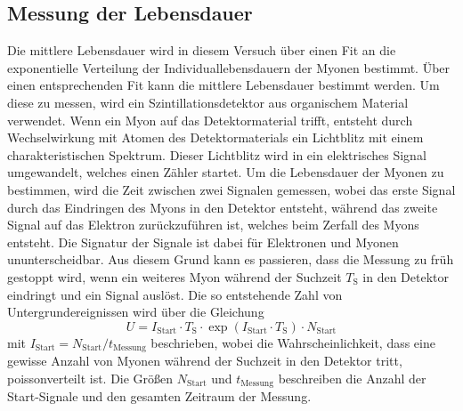 \subsection{Messung der Lebensdauer}

Die mittlere Lebensdauer wird in diesem Versuch über einen Fit an die exponentielle Verteilung der Individuallebensdauern der Myonen bestimmt.
Über einen entsprechenden Fit kann die mittlere Lebensdauer bestimmt werden.
Um diese zu messen,
wird ein Szintillationsdetektor aus organischem Material verwendet.
Wenn ein Myon auf das Detektormaterial trifft,
entsteht durch Wechselwirkung mit Atomen des Detektormaterials ein Lichtblitz mit einem charakteristischen Spektrum.
Dieser Lichtblitz wird in ein elektrisches Signal umgewandelt,
welches einen Zähler startet.
Um die Lebensdauer der Myonen zu bestimmen,
wird die Zeit zwischen zwei Signalen gemessen,
wobei das erste Signal durch das Eindringen des Myons in den Detektor entsteht,
während das zweite Signal auf das Elektron zurückzuführen ist,
welches beim Zerfall des Myons entsteht.
Die Signatur der Signale ist dabei für Elektronen und Myonen ununterscheidbar.
Aus diesem Grund kann es passieren,
dass die Messung zu früh gestoppt wird,
wenn ein weiteres Myon während der Suchzeit $T_\text{S}$ in den Detektor eindringt und ein Signal auslöst.
Die so entstehende Zahl von Untergrundereignissen wird über die Gleichung
\begin{equation}
    U = I_\text{Start} \cdot T_\text{S} \cdot \exp(I_\text{Start} \cdot T_\text{S}) \cdot N_\text{Start}
    \label{eqn:untergrund}
\end{equation}
mit $I_\text{Start} = N_\text{Start} / t_\text{Messung}$ beschrieben,
wobei die Wahrscheinlichkeit,
dass eine gewisse Anzahl von Myonen während der Suchzeit in den Detektor tritt,
poissonverteilt ist.
Die Größen $N_\text{Start}$ und $t_\text{Messung}$ beschreiben die Anzahl der Start-Signale und den gesamten Zeitraum der Messung.
